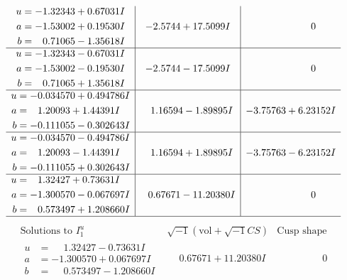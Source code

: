 \documentclass[1p]{elsarticle_modified}
\theoremstyle{definition}
\newcommand{\I}{\sqrt{-1}}
\begin{document}
$$\begin{array}{c|c|c}
\begin{aligned}
u &= -1.32343 + 0.67031 I \\
a &= -1.53002 + 0.19530 I \\
b &= \phantom{-}0.71065 - 1.35618 I\end{aligned}
 & -2.5744 + 17.5099 I & \phantom{-0.000000 } 0 \\ \hline\begin{aligned}
u &= -1.32343 - 0.67031 I \\
a &= -1.53002 - 0.19530 I \\
b &= \phantom{-}0.71065 + 1.35618 I\end{aligned}
 & -2.5744 - 17.5099 I & \phantom{-0.000000 } 0 \\ \hline\begin{aligned}
u &= -0.034570 + 0.494786 I \\
a &= \phantom{-}1.20093 + 1.44391 I \\
b &= -0.111055 - 0.302643 I\end{aligned}
 & \phantom{-}1.16594 - 1.89895 I & -3.75763 + 6.23152 I \\ \hline\begin{aligned}
u &= -0.034570 - 0.494786 I \\
a &= \phantom{-}1.20093 - 1.44391 I \\
b &= -0.111055 + 0.302643 I\end{aligned}
 & \phantom{-}1.16594 + 1.89895 I & -3.75763 - 6.23152 I \\ \hline\begin{aligned}
u &= \phantom{-}1.32427 + 0.73631 I \\
a &= -1.300570 - 0.067697 I \\
b &= \phantom{-}0.573497 + 1.208660 I\end{aligned}
 & \phantom{-}0.67671 - 11.20380 I & \phantom{-0.000000 } 0\\
 \hline 
 \end{array}$$\newpage$$\begin{array}{c|c|c}  
\text{Solutions to }I^u_{1}& \I (\text{vol} + \sqrt{-1}CS) & \text{Cusp shape}\\
 \hline 
\begin{aligned}
u &= \phantom{-}1.32427 - 0.73631 I \\
a &= -1.300570 + 0.067697 I \\
b &= \phantom{-}0.573497 - 1.208660 I\end{aligned}
 & \phantom{-}0.67671 + 11.20380 I & \phantom{-0.000000 } 0 \\ \hline\begin{aligned}

\end{aligned}
\end{array}$$
\end{document}
